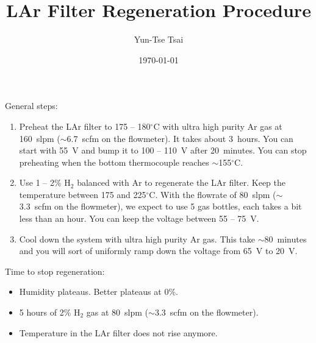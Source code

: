 \documentclass[letterpaper,11pt]{article}
\newcommand{\Hydro}     {H$_2$}
\newcommand{\dC}        {$^\circ$C}
\begin{document}
\title{\textbf{LAr Filter Regeneration Procedure}}
\author{Yun-Tse Tsai}
\date{\today}

\maketitle


General steps:
\begin{enumerate}
\setlength\itemsep{-0.2em}
\item Preheat the LAr filter to 175 -- 180{\dC} with ultra high purity Ar gas at 160~slpm ($\sim$6.7~scfm on the flowmeter).  It takes about 3~hours.  You can start with 55~V and bump it to 100 -- 110~V after 20~minutes.  You can stop preheating when the bottom thermocouple reaches $\sim$155{\dC}.
\item Use 1 -- 2\% {\Hydro} balanced with Ar to regenerate the LAr filter.  Keep the temperature between 175 and 225{\dC}.  With the flowrate of 80~slpm ($\sim$3.3~scfm on the flowmeter), we expect to use 5 gas bottles, each takes a bit less than an hour.  You can keep the voltage between 55 -- 75~V.
\item Cool down the system with ultra high purity Ar gas.  This take $\sim$80~minutes and you will sort of uniformly ramp down the voltage from 65~V to 20~V.
\end{enumerate}

Time to stop regeneration:
\begin{itemize}
\setlength\itemsep{-0.2em}
\item Humidity plateaus.  Better plateaus at 0\%.
\item 5 hours of 2\% {\Hydro} gas at 80~slpm ($\sim$3.3~scfm on the flowmeter).
\item Temperature in the LAr filter does not rise anymore.
\end{itemize}
\end{document}
